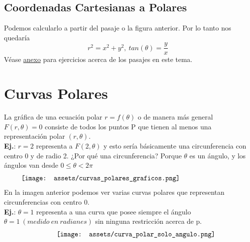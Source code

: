 \documentclass[10pt,a4paper]{article}
\begin{document}
\subsection*{Coordenadas Cartesianas a Polares}
Podemos calcularlo a partir del pasaje o la figura anterior. Por lo tanto nos quedaría 
\[r^{2} = x^{2} + y^{2},\ tan(\theta) = \frac{y}{x} \]
Véase \hyperref[subsec:pasaje_coord_polares_cartesianas]{anexo} para ejercicios acerca de los pasajes en este tema. 
\section*{Curvas Polares}
La gráfica de una ecuación polar $r = f(\theta)$ o de manera más general $F(r, \theta) = 0$ consiste de todos los puntos P que tienen al menos una representación polar $(r, \theta)$. \\
\textbf{Ej.}: $ r = 2 $ representa a $F(2, \theta)$ y esto sería básicamente una circunferencia con centro 0 y de radio 2. ¿Por qué una circunferencia? Porque $\theta$ es un ángulo, y los ángulos van desde $0\le \theta < 2\pi$
\[\begin{minipage}[b]{0.9\textwidth}
    \texttt{[image: assets/curvas\_polares\_graficos.png]}
\end{minipage}\]
En la imagen anterior podemos ver varias curvas polares que representan circunferencias con centro 0. \\

\textbf{Ej.}: $ \theta = 1$ representa a una curva que posee siempre el ángulo $\theta = 1 \ (medido \ en \ radianes)$ sin ninguna restricción acerca de p. 
\[\begin{minipage}[b]{0.6\textwidth}
    \texttt{[image: assets/curva\_polar\_solo\_angulo.png]}
\end{minipage}\]
\end{document}
